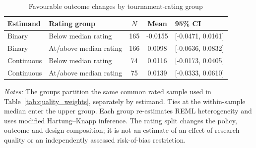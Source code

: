\begin{table}[htbp]\centering\small
\caption{Favourable outcome changes by tournament-rating group}\label{tab:quality_groups}
\setlength{\tabcolsep}{4pt}
\begin{tabular}{llccl}\toprule
Estimand & Rating group & $N$ & Mean & 95\% CI \\
\midrule
Binary & Below median rating & 165 & -0.0155 & [-0.0471, 0.0161] \\
Binary & At/above median rating & 166 & 0.0098 & [-0.0636, 0.0832] \\
Continuous & Below median rating & 74 & 0.0116 & [-0.0173, 0.0405] \\
Continuous & At/above median rating & 75 & 0.0139 & [-0.0333, 0.0610] \\
\bottomrule\end{tabular}
\par\vspace{4pt}\begin{minipage}{\textwidth}\footnotesize
\textit{Notes:} The groups partition the same common rated sample used in Table~\ref{tab:quality_weights}, separately by estimand. Ties at the within-sample median enter the upper group. Each group re-estimates REML heterogeneity and uses modified Hartung--Knapp inference. The rating split changes the policy, outcome and design composition; it is not an estimate of an effect of research quality or an independently assessed risk-of-bias restriction.
\end{minipage}
\end{table}
